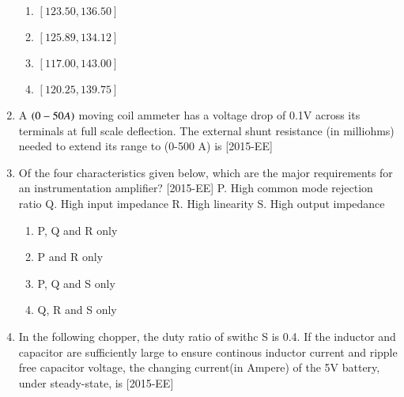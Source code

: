 \documentclass[journal,12pt,onecolumn]{IEEEtran}
\theoremstyle{remark}
\begin{document}
\begin{enumerate}
\begin{figure}[!ht]
\label{fig:my_label}
\end{figure}

    \begin{enumerate}
        \item $[123.50, 136.50]$
        \item $[125.89, 134.12]$
        \item $[117.00, 143.00]$
        \item $[120.25, 139.75]$
    \end{enumerate}


    \item A $\left(0 - 50A\right)$ moving coil ammeter has a voltage drop of 0.1V across its terminals at full scale deflection. The external shunt resistance (in  milliohms) needed to extend its range to (0-500 A) is \underline{\hspace{2cm}} \hfill{[2015-EE]}

    \item Of the four characteristics given below, which are the major requirements for an instrumentation amplifier? \hfill{[2015-EE]}
    P. High common mode rejection ratio
    Q. High input impedance
    R. High linearity
    S. High output impedance
    \begin{enumerate}
        \item P, Q and R only
        \item P and R only
        \item P, Q and S only
        \item Q, R and S only
    \end{enumerate}

    \item In the following chopper, the duty ratio of swithc S is 0.4. If the inductor and capacitor are sufficiently large to ensure continous inductor current and ripple free capacitor voltage, the changing current(in Ampere) of the 5V battery, under steady-state, is \underline{\hspace{2cm}} \hfill{[2015-EE]}


\end{enumerate}
\end{document}
